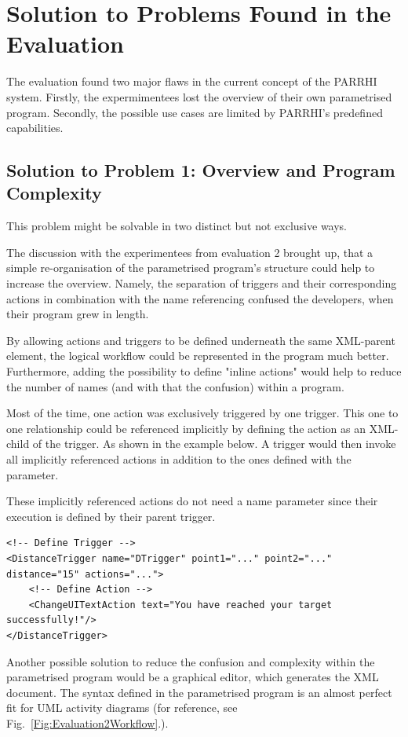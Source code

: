 \section{Solution to Problems Found in the Evaluation}\label{Section:SolutionToEval}
 
The evaluation found two major flaws in the current concept of the PARRHI system. Firstly, the expermimentees lost the overview of their own parametrised program. Secondly, the possible use cases are limited by PARRHI's predefined capabilities.

\subsection{Solution to Problem 1: Overview and Program Complexity}
This problem might be solvable in two distinct but not exclusive ways.

The discussion with the experimentees from evaluation 2 brought up, that a simple re-organisation of the parametrised program's structure could help to increase the overview. Namely, the separation of triggers and their corresponding actions in combination with the name referencing confused the developers, when their program grew in length.

By allowing actions and triggers to be defined underneath the same XML-parent element, the logical workflow could be represented in the program much better. Furthermore, adding the possibility to define "inline actions" would help to reduce the number of names (and with that the confusion) within a program.

Most of the time, one action was exclusively triggered by one trigger. This one to one relationship could be referenced implicitly by defining the action as an XML-child of the trigger. As shown in the example below. A trigger would then invoke all implicitly referenced actions in addition to the ones defined with the  parameter.

These implicitly referenced actions do not need a name parameter since their execution is defined by their parent trigger.

\begin{lstlisting}
<!-- Define Trigger -->
<DistanceTrigger name="DTrigger" point1="..." point2="..." distance="15" actions="...">
	<!-- Define Action -->
	<ChangeUITextAction text="You have reached your target successfully!"/>
</DistanceTrigger>
\end{lstlisting}

Another possible solution to reduce the confusion and complexity within the parametrised program would be a graphical editor, which generates the XML document. The syntax defined in the parametrised program is an almost perfect fit for UML activity diagrams (for reference, see Fig.~\ref{Fig:Evaluation2Workflow}.).

